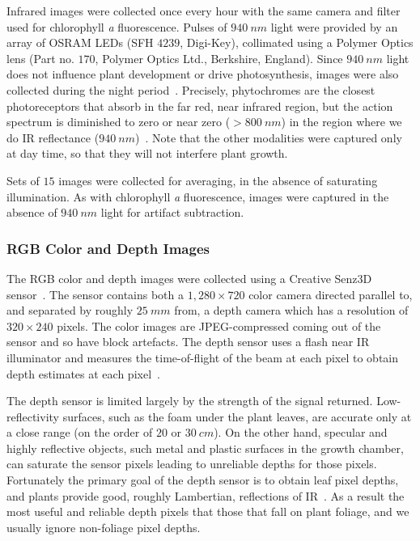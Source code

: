 Infrared images were collected once every hour with the same camera and filter used for chlorophyll {\it a} fluorescence.
Pulses of $940~nm$ light were provided by an array of OSRAM LEDs (SFH $4239$, Digi-Key), collimated using a Polymer Optics lens (Part no. $170$, Polymer Optics Ltd., Berkshire, England).
Since $940~nm$ light does not influence plant development or drive photosynthesis, images were also collected during the night period~\cite{eskins1992light}.
Precisely, phytochromes are the closest photoreceptors that absorb in the far red, near infrared region, but the action spectrum is diminished to zero or near zero ($>800~nm$) in the region where we do IR reflectance ($940~nm$)~\cite{butler1964actton}.
Note that the other modalities were captured only at day time, so that they will not interfere plant growth.

Sets of $15$ images were collected for averaging, in the absence of saturating illumination.
As with chlorophyll {\it a} fluorescence, images were captured in the absence of $940~nm$ light for artifact subtraction.



\subsubsection{RGB Color and Depth Images} %
The RGB color and depth images were collected using a Creative Senz3D sensor~\cite{nguyen2015vietnamese}.
The sensor contains both a $1,280 \times 720$ color camera directed parallel to, and separated by roughly $25~mm$ from, a depth camera which has a resolution of $320\times240$ pixels.  The color images are JPEG-compressed coming out of the sensor and so have block artefacts.  The depth sensor uses a flash near IR illuminator and measures the time-of-flight of the beam at each pixel to obtain depth estimates at each pixel~\cite{Hansard2013}.

The depth sensor is limited largely by the strength of the signal returned.  Low-reflectivity surfaces, such as the foam under the plant leaves, are accurate only at a close range (on the order of $20$ or $30~cm$).  On the other hand, specular and highly reflective objects, such metal and plastic surfaces in the growth chamber, can saturate the sensor pixels leading to unreliable depths for those pixels.  Fortunately the primary goal of the depth sensor is to obtain leaf pixel depths, and plants provide good, roughly Lambertian, reflections of IR~\cite{Chelle2006219}.  As a result the most useful and reliable depth pixels that those that fall on plant foliage, and we usually ignore non-foliage pixel depths.

